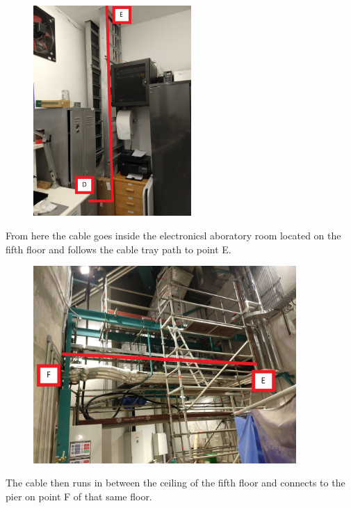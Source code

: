   
\newpage

  \begin{figure}
    \centering
    \includegraphics[width=6cm]{images/17.jpg}
    \label{fig:jlsimon}
  \end{figure}

From here the cable goes inside the electronicsl aboratory room located on the fifth floor and follows the cable tray path to point E.

  \begin{figure}
    \centering
    \includegraphics[width=10cm]{images/18.jpg}
    \label{fig:jlsimon}
  \end{figure}

The cable then runs in between the ceiling of the fifth floor and connects to the pier on point F of that same floor.

